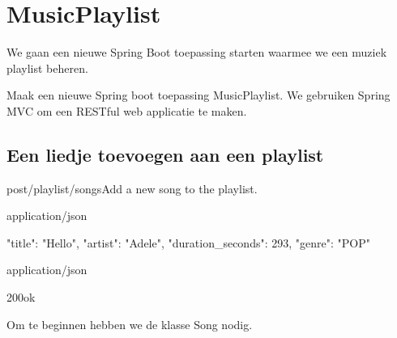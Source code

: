 \section{MusicPlaylist}

We gaan een nieuwe Spring Boot toepassing starten waarmee we een muziek playlist beheren. 

\begin{oefening}
Maak een nieuwe Spring boot toepassing MusicPlaylist. We gebruiken Spring MVC om een RESTful web applicatie te maken.  
\end{oefening}

\subsection{Een liedje toevoegen aan een playlist}

\begin{apiRoute}{post}{/playlist/songs}{Add a new song to the playlist.}
\begin{routeParameter}
\end{routeParameter}
\begin{routeRequest}{application/json}
\begin{routeRequestBody}
{
  "title": "Hello",
  "artist": "Adele",
  "duration_seconds": 293,
  "genre": "POP"
}
\end{routeRequestBody}
\end{routeRequest}
\begin{routeResponse}{application/json}
\begin{routeResponseItem}{200}{ok}
\end{routeResponseItem}
\end{routeResponse}
\end{apiRoute}


Om te beginnen hebben we de klasse Song nodig. 

